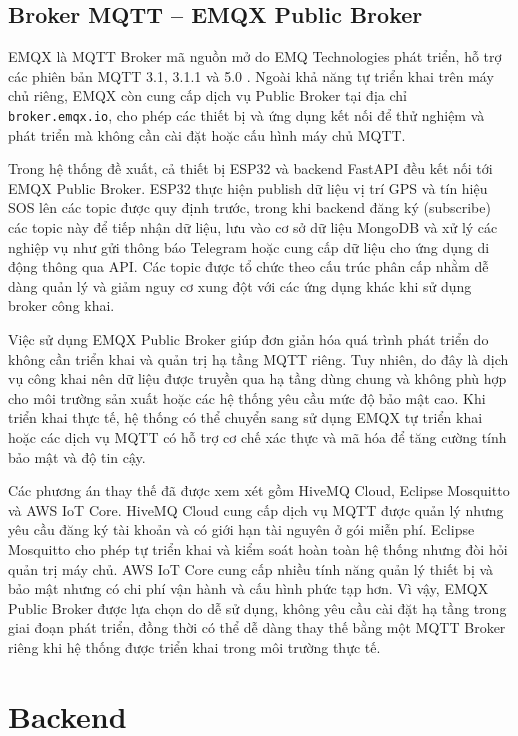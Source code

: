 \documentclass[../DoAn.tex]{subfiles}
\begin{document}
\subsection{Broker MQTT – EMQX Public Broker}
\label{subsection:3.2.2}

EMQX là MQTT Broker mã nguồn mở do EMQ Technologies phát triển, hỗ trợ các phiên bản MQTT 3.1, 3.1.1 và 5.0 \cite{emqx_broker}. Ngoài khả năng tự triển khai trên máy chủ riêng, EMQX còn cung cấp dịch vụ Public Broker tại địa chỉ \texttt{broker.emqx.io}, cho phép các thiết bị và ứng dụng kết nối để thử nghiệm và phát triển mà không cần cài đặt hoặc cấu hình máy chủ MQTT.

Trong hệ thống đề xuất, cả thiết bị ESP32 và backend FastAPI đều kết nối tới EMQX Public Broker. ESP32 thực hiện publish dữ liệu vị trí GPS và tín hiệu SOS lên các topic được quy định trước, trong khi backend đăng ký (subscribe) các topic này để tiếp nhận dữ liệu, lưu vào cơ sở dữ liệu MongoDB và xử lý các nghiệp vụ như gửi thông báo Telegram hoặc cung cấp dữ liệu cho ứng dụng di động thông qua API. Các topic được tổ chức theo cấu trúc phân cấp nhằm dễ dàng quản lý và giảm nguy cơ xung đột với các ứng dụng khác khi sử dụng broker công khai.

Việc sử dụng EMQX Public Broker giúp đơn giản hóa quá trình phát triển do không cần triển khai và quản trị hạ tầng MQTT riêng. Tuy nhiên, do đây là dịch vụ công khai nên dữ liệu được truyền qua hạ tầng dùng chung và không phù hợp cho môi trường sản xuất hoặc các hệ thống yêu cầu mức độ bảo mật cao. Khi triển khai thực tế, hệ thống có thể chuyển sang sử dụng EMQX tự triển khai hoặc các dịch vụ MQTT có hỗ trợ cơ chế xác thực và mã hóa để tăng cường tính bảo mật và độ tin cậy.

Các phương án thay thế đã được xem xét gồm HiveMQ Cloud, Eclipse Mosquitto và AWS IoT Core. HiveMQ Cloud cung cấp dịch vụ MQTT được quản lý nhưng yêu cầu đăng ký tài khoản và có giới hạn tài nguyên ở gói miễn phí. Eclipse Mosquitto cho phép tự triển khai và kiểm soát hoàn toàn hệ thống nhưng đòi hỏi quản trị máy chủ. AWS IoT Core cung cấp nhiều tính năng quản lý thiết bị và bảo mật nhưng có chi phí vận hành và cấu hình phức tạp hơn. Vì vậy, EMQX Public Broker được lựa chọn do dễ sử dụng, không yêu cầu cài đặt hạ tầng trong giai đoạn phát triển, đồng thời có thể dễ dàng thay thế bằng một MQTT Broker riêng khi hệ thống được triển khai trong môi trường thực tế.

\section{Backend}
\label{section:3.3}
\end{document}
